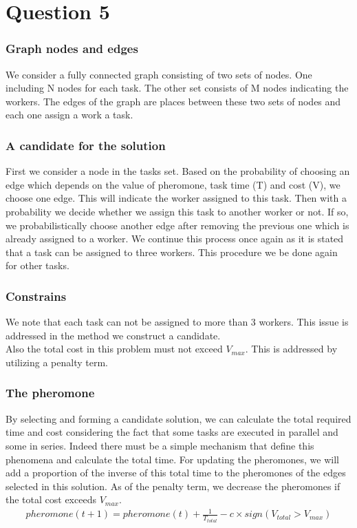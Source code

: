 \documentclass[]{article}
\begin{document}
	\section{Question 5}
	\subsubsection*{Graph nodes and edges}
	We consider a fully connected graph consisting of two sets of nodes. One including N nodes for each task. The other set consists of M nodes indicating the workers. The edges of the graph are places between these two sets of nodes and each one assign a work a task.
	
	\subsubsection*{A candidate for the solution}
	First we consider a node in the tasks set. Based on the probability of choosing an edge which depends on the value of pheromone, task time (T) and cost (V),  we choose one edge. This will indicate the worker assigned to this task. Then with a probability we decide whether we assign this task to another worker or not. If so, we probabilistically choose another edge after removing the previous one which is already assigned to a worker. We continue this process once again as it is stated that a task can be assigned to three workers. This procedure we be done again for other tasks.
	
	\subsubsection*{Constrains}
	We note that each task can not be assigned to more than 3 workers. This issue is addressed in the method we construct a candidate.\\
	Also the total cost in this problem must not exceed $V_{max}$. This is addressed by utilizing a penalty term.
	
	\subsubsection*{The pheromone}
	By selecting and forming a candidate solution, we can calculate the total required time and cost considering the fact that some tasks are executed in parallel and some in series. Indeed there must be a simple mechanism that define this phenomena and calculate the total time. For updating the pheromones, we will add a proportion of the inverse of this total time to the pheromones of the edges selected in this solution. As of the penalty term, we decrease the pheromones if the total cost exceeds $V_{max}$.
	\begin{align*}
		pheromone(t+1) = pheromone(t) + \frac{1}{T_{total}} - c \times sign\left(V_{total} > V_{max}\right)
	\end{align*}
	
\end{document}
